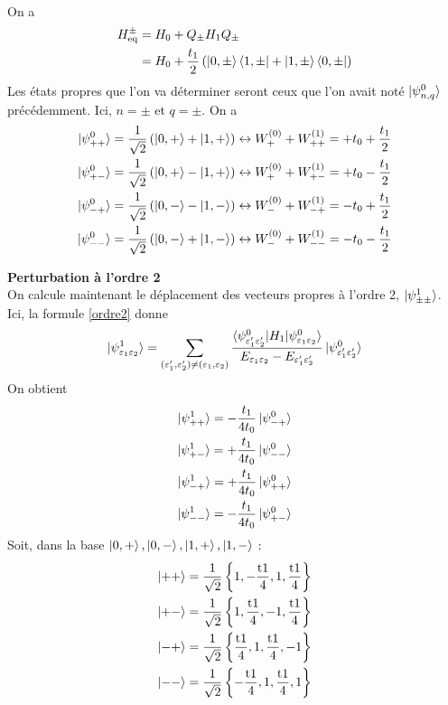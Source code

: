 \documentclass[11pt]{article}
\begin{document}
On a
\begin{align*}
	H^{\pm}_{\text{eq}} &= H_0 + Q_\pm H_1 Q_\pm \\
	&= H_0 + \frac{t_1}{2} \left( \ket{0,\pm}\bra{1,\pm} + \ket{1,\pm}\bra{0,\pm} \right)
\end{align*}
Les états propres que l'on va déterminer seront ceux que l'on avait noté $\ket{\psi^0_{n,q}}$ précédemment. Ici, $n=\pm$ et $q=\pm$. On a
\begin{align*}
	\ket{\psi^0_{++}} = \frac{1}{\sqrt{2}} \left( \ket{0,+} + \ket{1,+} \right) &\leftrightarrow W^{(0)}_{+} + W^{(1)}_{++} = +t_0 + \frac{t_1}{2} \\
	\ket{\psi^0_{+-}} = \frac{1}{\sqrt{2}} \left( \ket{0,+} - \ket{1,+} \right) &\leftrightarrow W^{(0)}_+ + W^{(1)}_{+-} = +t_0 - \frac{t_1}{2} \\
	\ket{\psi^0_{-+}} = \frac{1}{\sqrt{2}} \left( \ket{0,-} - \ket{1,-} \right) &\leftrightarrow W^{(0)}_- + W^{(1)}_{-+} = -t_0 + \frac{t_1}{2} \\
	\ket{\psi^0_{--}} = \frac{1}{\sqrt{2}} \left( \ket{0,-} + \ket{1,-} \right) &\leftrightarrow W^{(0)}_- + W^{(1)}_{--} = -t_0 - \frac{t_1}{2}
\end{align*}

\textbf{Perturbation à l'ordre 2}\\
On calcule maintenant le déplacement des vecteurs propres à l'ordre 2, $\ket{\psi^1_{\pm \pm}}$.
Ici, la formule \eqref{ordre2} donne
\begin{equation}
	\ket{\psi^1_{\varepsilon_1 \varepsilon_2}} = \sum_{(\varepsilon_1',\varepsilon_2') \neq (\varepsilon_1, \varepsilon_2)} \frac{\braket{\psi^0_{\varepsilon_1' \varepsilon_2'}| H_1 | \psi^0_{\varepsilon_1 \varepsilon_2}}}{E_{\varepsilon_1 \varepsilon_2} - E_{\varepsilon_1'\varepsilon_2'}} \ket{\psi^0_{\varepsilon_1' \varepsilon_2'}}
\end{equation}
On obtient
\begin{align*}
	\ket{\psi^1_{++}} = - \frac{t_1}{4t_0} \ket{\psi^0_{-+}} \\
	\ket{\psi^1_{+-}} = + \frac{t_1}{4t_0} \ket{\psi^0_{--}} \\
	\ket{\psi^1_{-+}} = + \frac{t_1}{4t_0} \ket{\psi^0_{++}} \\
	\ket{\psi^1_{--}} = - \frac{t_1}{4t_0} \ket{\psi^0_{+-}}
\end{align*}
Soit, dans la base $\ket{0,+},\ket{0,-},\ket{1,+},\ket{1,-}$ :
\begin{align}
	\ket{++} = \frac{1}{\sqrt{2}} \left\{1,-\frac{\text{t1}}{4},1,\frac{\text{t1}}{4}\right\} \\
	\ket{+-} = \frac{1}{\sqrt{2}} \left\{1,\frac{\text{t1}}{4},-1,\frac{\text{t1}}{4}\right\} \\
	\ket{-+} = \frac{1}{\sqrt{2}} \left\{\frac{\text{t1}}{4},1,\frac{\text{t1}}{4},-1\right\} \\
	\ket{--} = \frac{1}{\sqrt{2}} \left\{-\frac{\text{t1}}{4},1,\frac{\text{t1}}{4},1\right\}
\end{align}
\end{document}
